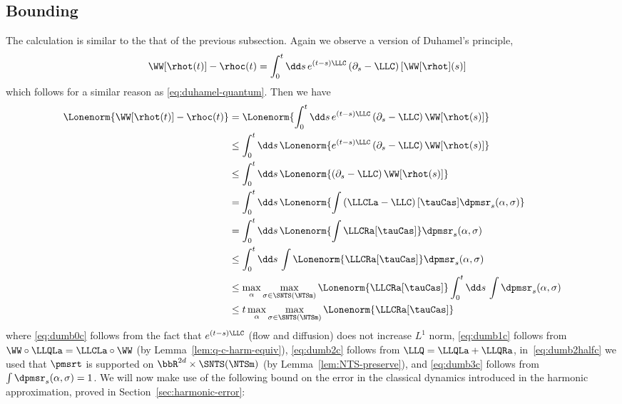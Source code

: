 \documentclass{article}
\numberwithin{equation}{section}
\begin{document}
\subsection{Bounding }\label{sec:classical-duhamel}
The calculation is similar to the that of the previous subsection. Again we observe a version of Duhamel's principle,
\begin{align}\label{eq:duhamel-classical}
	\WW[\rhot(t)]-\rhoc(t)	& = \int_0^t \dd s \,  e^{ (t-s) \LLC} \left( \partial_s - \LLC \right) [\WW[\rhot](s)]
\end{align}
which follows for a similar reason as \eqref{eq:duhamel-quantum}.
Then we have 
\begin{align}
	\Lonenorm{\WW[\rhot(t)]-\rhoc(t)}
	& = \Lonenorm{  \int_0^t \dd s \,  e^{ (t-s) \LLC} \left( \partial_s - \LLC \right) \WW[\rhot(s)] } \\
	& \le  \int_0^t \dd s \,   \Lonenorm{ e^{ (t-s) \LLC} \left( \partial_s - \LLC \right) \WW[\rhot(s)] } \\
	\label{eq:dumb0c}
	& \le  \int_0^t \dd s \,   \Lonenorm{ \left( \partial_s - \LLC \right) \WW[\rhot(s)] } \\
	\label{eq:dumb1c}
	& =  \int_0^t \dd s \,   \Lonenorm{ \int \left(  \LLCLa - \LLC \right) [\tauCas] \dpmsr_s(\alpha,\sigma)  } \\
	\label{eq:dumb2c}
	& =  \int_0^t \dd s \,   \Lonenorm{ \int  \LLCRa   [\tauCas] } \dpmsr_s(\alpha,\sigma) \\
	&\le \int_0^t \dd s \, \int    \Lonenorm{ \LLCRa [\tauCas] } \dpmsr_s(\alpha,\sigma)\\
	&\le 
 \label{eq:dumb2halfc}
 \max_\alpha \max_{\sigma\in\SNTS(\NTSm)} \Lonenorm{ \LLCRa [\tauCas]} \int_0^t \dd s \, \int \dpmsr_s(\alpha,\sigma) \\
	\label{eq:dumb3c}
	&\le t \max_\alpha \max_{\sigma\in\SNTS(\NTSm)} \Lonenorm{ \LLCRa [\tauCas]}
\end{align}
where \eqref{eq:dumb0c} follows from the fact that $e^{ (t-s) \LLC}$ (flow and diffusion) does not increase $L^1$ norm,
\eqref{eq:dumb1c} follows from $\WW\circ \LLQLa = \LLCLa\circ\WW$ (by Lemma~\ref{lem:q-c-harm-equiv}),  
\eqref{eq:dumb2c} follows from $\LLQ = \LLQLa+\LLQRa$, in~\eqref{eq:dumb2halfc} we used that $\pmsrt$ 
is supported on $\bbR^{2d}\times \SNTS(\NTSm)$ (by Lemma~\ref{lem:NTS-preserve}), and \eqref{eq:dumb3c} follows from $\int \dpmsr_s(\alpha,\sigma) = 1$. 
We will now make use of the following bound on the error in the classical dynamics introduced in the harmonic approximation, proved in Section~\ref{sec:harmonic-error}:
\end{document}
